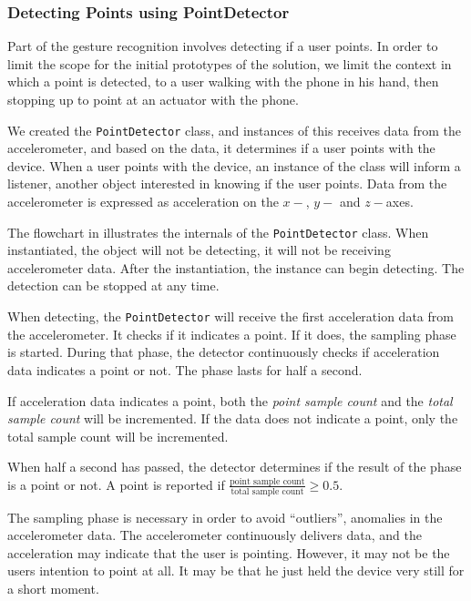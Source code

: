 \subsubsection{Detecting Points using PointDetector}

Part of the gesture recognition involves detecting if a user points. 
In order to limit the scope for the initial prototypes of the solution, 
we limit the context in which a point is detected, 
to a user walking with the phone in his hand, 
then stopping up to point at an actuator with the phone.

We created the \texttt{PointDetector} class, 
and instances of this receives data from the accelerometer, 
and based on the data, 
it determines if a user points with the device. 
When a user points with the device, 
an instance of the class will inform a listener, 
\ie another object interested in knowing if the user points.
Data from the accelerometer is expressed as acceleration on the $x-$, $y-$ and $z-$axes.

The flowchart in  illustrates the internals of the \texttt{PointDetector} class. 
When instantiated, the object will not be detecting, 
\ie it will not be receiving accelerometer data. 
After the instantiation, the instance can begin detecting. 
The detection can be stopped at any time.

When detecting, the \texttt{PointDetector} will receive the first acceleration data from the accelerometer. 
It checks if it indicates a point. 
If it does, the sampling phase is started.
During that phase, the detector continuously checks if acceleration data indicates a point or not. 
The phase lasts for half a second.

If acceleration data indicates a point, 
both the \emph{point sample count} and the \emph{total sample count} will be incremented. 
If the data does not indicate a point, 
only the total sample count will be incremented.

When half a second has passed, the detector determines if the result of the phase is a point or not. 
A point is reported if $\frac{\text{point sample count}}{\text{total sample count}} \geq 0.5$.

The sampling phase is necessary in order to avoid ``outliers'', 
\ie anomalies in the accelerometer data. 
The accelerometer continuously delivers data, 
and the acceleration may indicate that the user is pointing. 
However, it may not be the users intention to point at all. 
It may be that he just held the device very still for a short moment.

